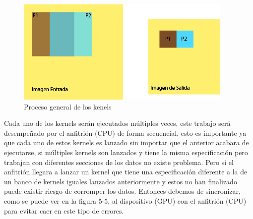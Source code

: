 \begin{figure}[ph]
			\centering
				\includegraphics[scale=1]{img/prosImg.jpg}
			\caption{Proceso general de los kenels}
\end{figure}




Cada uno de los kernels serán ejecutados múltiples veces, este trabajo será desempeñado por el anfitrión (CPU) de forma secuencial, esto es importante ya que cada uno de estos kernels es lanzado sin importar que el anterior acabara de ejecutarse, si múltiples kernels son lanzados y tiene la misma especificación pero trabajan con diferentes secciones de los datos no existe problema. Pero si el anfitrión llegara a lanzar un kernel que tiene una especificación diferente a la de un banco de kernels iguales lanzados anteriormente y estos no han finalizado puede existir riesgo de corromper los datos. Entonces debemos de sincronizar, como se puede ver en la figura 5-5, al  dispositivo (GPU) con el anfitrión (CPU) para evitar caer en este tipo de errores.

